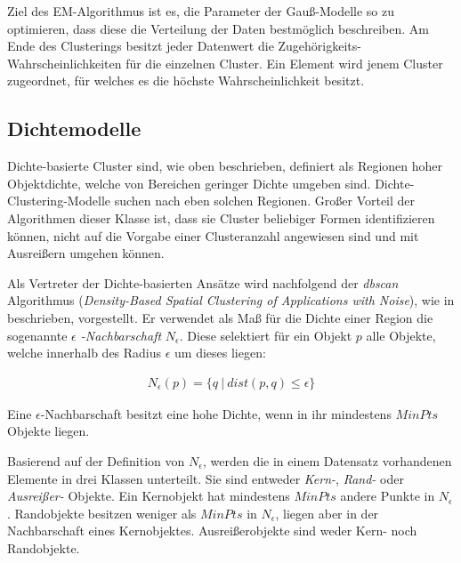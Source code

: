 Ziel des EM-Algorithmus ist es, die Parameter der Gauß-Modelle so zu optimieren, dass diese die Verteilung
der Daten bestmöglich beschreiben. Am Ende des Clusterings besitzt jeder Datenwert die Zugehörigkeits-Wahrscheinlichkeiten
für die einzelnen Cluster. Ein Element wird jenem Cluster zugeordnet, für welches es die höchste
Wahrscheinlichkeit besitzt.

\subsection{Dichtemodelle}
\label{sec:grund_density_clustering}

Dichte-basierte Cluster sind, wie oben beschrieben, definiert als Regionen hoher Objektdichte, welche
von Bereichen geringer Dichte umgeben sind. Dichte-Clustering-Modelle suchen nach eben solchen Regionen.
Großer Vorteil der Algorithmen dieser Klasse ist, dass sie Cluster beliebiger Formen identifizieren können,
nicht auf die Vorgabe einer Clusteranzahl angewiesen sind und mit Ausreißern umgehen können. \cite[]{tan2007introduction}

Als Vertreter der Dichte-basierten Ansätze wird nachfolgend der \textit{\acrshort*{dbscan}} Algorithmus
(\textit{Density-Based Spatial Clustering of Applications with Noise}), wie in \cite[]{Gao2012} beschrieben, vorgestellt.
Er verwendet als Maß für die Dichte einer Region die sogenannte \textit{$\epsilon$ -Nachbarschaft} $N_{\epsilon}$.
Diese selektiert für ein Objekt $p$ alle Objekte, welche innerhalb des Radius $\epsilon$ um dieses liegen:

\begin{ceqn}
\begin{align}
    \label{eq_dbscan_1}
    N_{\epsilon}(p) = \{ q\ |\ dist(p,q) \leq \epsilon \}
\end{align}
\end{ceqn}

Eine $\epsilon$-Nachbarschaft besitzt eine hohe Dichte, wenn in ihr mindestens $MinPts$ Objekte liegen.

Basierend auf der Definition von $N_{\epsilon}$, werden die in einem Datensatz vorhandenen Elemente in
drei Klassen unterteilt. Sie sind entweder \textit{Kern-}, \textit{Rand-} oder \textit{Ausreißer-} Objekte.
Ein Kernobjekt hat mindestens $MinPts$ andere Punkte in $N_{\epsilon}$.
Randobjekte besitzen weniger als $MinPts$ in $N_{\epsilon}$, liegen aber in der Nachbarschaft eines Kernobjektes.
Ausreißerobjekte sind weder Kern- noch Randobjekte.

